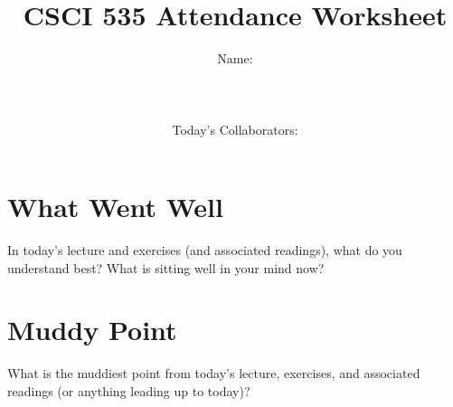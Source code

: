 \documentclass{article}
\title{CSCI 535 Attendance Worksheet}
\author{Name: \rule{3in}{0.15mm} \\~\\
    Today's Collaborators: \rule{3in}{0.15mm} }
\date{date: \rule{3in}{0.15mm} }
\begin{document}
\maketitle

\noindent
\section*{What Went Well}

In today's lecture and exercises (and associated readings),
what do you understand best?  What is sitting
well in your mind now?

\vspace{2in}

\section*{Muddy Point}

What is the muddiest point from today's lecture, exercises, and associated
readings (or anything leading up to today)?
\end{document}
